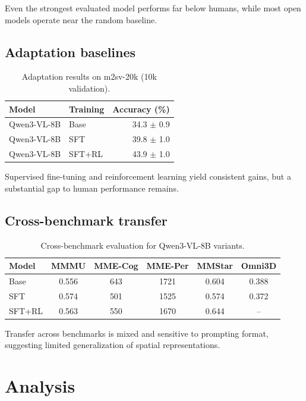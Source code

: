 \documentclass{article}
\begin{document}
Even the strongest evaluated model performs far below humans, while most open
models operate near the random baseline.

\subsection{Adaptation baselines}

\begin{table}[t]
  \centering
  \caption{Adaptation results on m2sv-20k (10k validation).}
  \label{tab:m2sv-main-results}
  \begin{tabular}{l l r}
    \toprule
    Model & Training & Accuracy (\%) \\
    \midrule
    Qwen3-VL-8B & Base & 34.3 $\pm$ 0.9 \\
    Qwen3-VL-8B & SFT & 39.8 $\pm$ 1.0 \\
    Qwen3-VL-8B & SFT+RL & 43.9 $\pm$ 1.0 \\
    \bottomrule
  \end{tabular}
\end{table}

Supervised fine-tuning and reinforcement learning yield consistent gains, but a
substantial gap to human performance remains.

\subsection{Cross-benchmark transfer}

\begin{table}[t]
  \centering
  \caption{Cross-benchmark evaluation for Qwen3-VL-8B variants.}
  \label{tab:transfer}
  \begin{tabular}{l c c c c c}
    \toprule
    Model & MMMU & MME-Cog & MME-Per & MMStar & Omni3D \\
    \midrule
    Base & 0.556 & 643 & 1721 & 0.604 & 0.388 \\
    SFT & 0.574 & 501 & 1525 & 0.574 & 0.372 \\
    SFT+RL & 0.563 & 550 & 1670 & 0.644 & -- \\
    \bottomrule
  \end{tabular}
\end{table}

Transfer across benchmarks is mixed and sensitive to prompting format, suggesting
limited generalization of spatial representations.

\section{Analysis}
\end{document}
